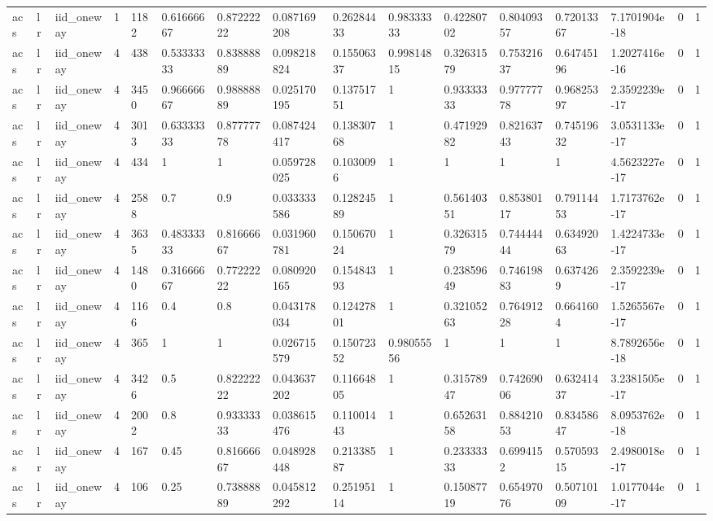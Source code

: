 \begin{tabular}{llllllllllllllll}
acs & lr & iid\_oneway & 1 & 1182 & 0.61666667 & 0.87222222 & 0.087169208 & 0.26284433 & 0.98333333 & 0.42280702 & 0.80409357 & 0.72013367 & 7.1701904e-18 & 0 & 1 \\
acs & lr & iid\_oneway & 4 & 438 & 0.53333333 & 0.83888889 & 0.098218824 & 0.15506337 & 0.99814815 & 0.32631579 & 0.75321637 & 0.64745196 & 1.2027416e-16 & 0 & 1 \\
acs & lr & iid\_oneway & 4 & 3450 & 0.96666667 & 0.98888889 & 0.025170195 & 0.13751751 & 1 & 0.93333333 & 0.97777778 & 0.96825397 & 2.3592239e-17 & 0 & 1 \\
acs & lr & iid\_oneway & 4 & 3013 & 0.63333333 & 0.87777778 & 0.087424417 & 0.13830768 & 1 & 0.47192982 & 0.82163743 & 0.74519632 & 3.0531133e-17 & 0 & 1 \\
acs & lr & iid\_oneway & 4 & 434 & 1 & 1 & 0.059728025 & 0.1030096 & 1 & 1 & 1 & 1 & 4.5623227e-17 & 0 & 1 \\
acs & lr & iid\_oneway & 4 & 2588 & 0.7 & 0.9 & 0.033333586 & 0.12824589 & 1 & 0.56140351 & 0.85380117 & 0.79114453 & 1.7173762e-17 & 0 & 1 \\
acs & lr & iid\_oneway & 4 & 3635 & 0.48333333 & 0.81666667 & 0.031960781 & 0.15067024 & 1 & 0.32631579 & 0.74444444 & 0.63492063 & 1.4224733e-17 & 0 & 1 \\
acs & lr & iid\_oneway & 4 & 1480 & 0.31666667 & 0.77222222 & 0.080920165 & 0.15484393 & 1 & 0.23859649 & 0.74619883 & 0.6374269 & 2.3592239e-17 & 0 & 1 \\
acs & lr & iid\_oneway & 4 & 1166 & 0.4 & 0.8 & 0.043178034 & 0.12427801 & 1 & 0.32105263 & 0.76491228 & 0.6641604 & 1.5265567e-17 & 0 & 1 \\
acs & lr & iid\_oneway & 4 & 365 & 1 & 1 & 0.026715579 & 0.15072352 & 0.98055556 & 1 & 1 & 1 & 8.7892656e-18 & 0 & 1 \\
acs & lr & iid\_oneway & 4 & 3426 & 0.5 & 0.82222222 & 0.043637202 & 0.11664805 & 1 & 0.31578947 & 0.74269006 & 0.63241437 & 3.2381505e-17 & 0 & 1 \\
acs & lr & iid\_oneway & 4 & 2002 & 0.8 & 0.93333333 & 0.038615476 & 0.11001443 & 1 & 0.65263158 & 0.88421053 & 0.83458647 & 8.0953762e-18 & 0 & 1 \\
acs & lr & iid\_oneway & 4 & 167 & 0.45 & 0.81666667 & 0.048928448 & 0.21338587 & 1 & 0.23333333 & 0.6994152 & 0.57059315 & 2.4980018e-17 & 0 & 1 \\
acs & lr & iid\_oneway & 4 & 106 & 0.25 & 0.73888889 & 0.045812292 & 0.25195114 & 1 & 0.15087719 & 0.65497076 & 0.50710109 & 1.0177044e-17 & 0 & 1 \\

\end{tabular}

